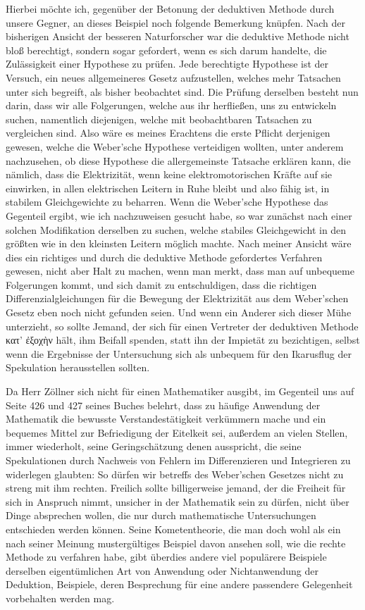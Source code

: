 \documentclass[a4paper, 11pt, oneside, german]{article}
\begin{document}
Hierbei möchte ich, gegenüber der Betonung der deduktiven Methode durch unsere Gegner, an dieses Beispiel noch folgende Bemerkung knüpfen. Nach der bisherigen Ansicht der besseren Naturforscher war die deduktive Methode nicht bloß berechtigt, sondern sogar gefordert, wenn es sich darum handelte, die Zulässigkeit einer Hypothese zu prüfen. Jede berechtigte Hypothese ist der Versuch, ein neues allgemeineres Gesetz aufzustellen, welches mehr Tatsachen unter sich begreift, als bisher beobachtet sind. Die Prüfung derselben besteht nun darin, dass wir alle Folgerungen, welche aus ihr herfließen, uns zu entwickeln suchen, namentlich diejenigen, welche mit beobachtbaren Tatsachen zu vergleichen sind. Also wäre es meines Erachtens die erste Pflicht derjenigen gewesen, welche die Weber'sche Hypothese verteidigen wollten, unter anderem nachzusehen, ob diese Hypothese die allergemeinste Tatsache erklären kann, die nämlich, dass die Elektrizität, wenn keine elektromotorischen Kräfte auf sie einwirken, in allen elektrischen Leitern in Ruhe bleibt und also fähig ist, in stabilem Gleichgewichte zu beharren. Wenn die Weber'sche Hypothese das Gegenteil ergibt, wie ich nachzuweisen gesucht habe, so war zunächst nach einer solchen Modifikation derselben zu suchen, welche stabiles Gleichgewicht in den größten wie in den kleinsten Leitern möglich machte. Nach meiner Ansicht wäre dies ein richtiges und durch die deduktive Methode gefordertes Verfahren gewesen, nicht aber Halt zu machen, wenn man merkt, dass man auf unbequeme Folgerungen kommt, und sich damit zu entschuldigen, dass die richtigen Differenzialgleichungen für die Bewegung der Elektrizität aus dem Weber'schen Gesetz eben noch nicht gefunden seien. Und wenn ein Anderer sich dieser Mühe unterzieht, so sollte Jemand, der sich für einen Vertreter der deduktiven Methode κατ' ἐξοχὴν hält, ihm Beifall spenden, statt ihn der Impietät zu bezichtigen, selbst wenn die Ergebnisse der Untersuchung sich als unbequem für den Ikarusflug der Spekulation herausstellen sollten.

Da Herr Zöllner sich nicht für einen Mathematiker ausgibt, im Gegenteil uns auf Seite 426 und 427 seines Buches belehrt, dass zu häufige Anwendung der Mathematik die bewusste Verstandestätigkeit verkümmern mache und ein bequemes Mittel zur Befriedigung der Eitelkeit sei, außerdem an vielen Stellen, immer wiederholt, seine Geringschätzung denen ausspricht, die seine Spekulationen durch Nachweis von Fehlern im Differenzieren und Integrieren zu widerlegen glaubten: So dürfen wir betreffs des Weber'schen Gesetzes nicht zu streng mit ihm rechten. Freilich sollte billigerweise jemand, der die Freiheit für sich in Anspruch nimmt, unsicher in der Mathematik sein zu dürfen, nicht über Dinge absprechen wollen, die nur durch mathematische Untersuchungen entschieden werden können. Seine Kometentheorie, die man doch wohl als ein nach seiner Meinung mustergültiges Beispiel davon ansehen soll, wie die rechte Methode zu verfahren habe, gibt überdies andere viel populärere Beispiele derselben eigentümlichen Art von Anwendung oder Nichtanwendung der Deduktion, Beispiele, deren Besprechung für eine andere passendere Gelegenheit vorbehalten werden mag.
\end{document}
